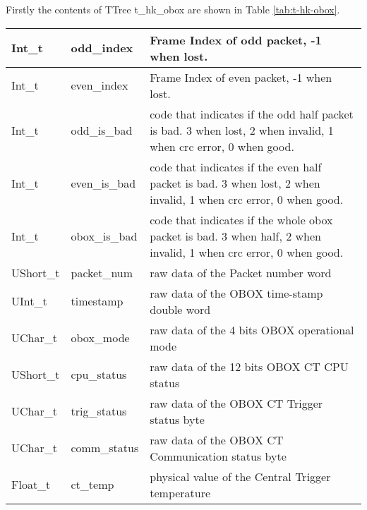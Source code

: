\documentclass[a4paper, 12pt, onecolumn]{article}
\begin{document}
Firstly the contents of TTree t\_hk\_obox are shown in Table \ref{tab:t-hk-obox}.

\begin{center}
  \label{tab:t-hk-obox}    
  \tablelasttail{\hline}
  \begin{supertabular}{| p{18mm} | p{38mm} | p{66mm} |}
    Int\_t      & odd\_index               & Frame Index of odd packet, -1 when lost. \\\hline
    Int\_t      & even\_index              & Frame Index of even packet, -1 when lost. \\\hline
    Int\_t      & odd\_is\_bad             & code that indicates if the odd half packet is bad. 3 when lost, 2 when invalid, 1 when crc error, 0 when good. \\\hline
    Int\_t      & even\_is\_bad            & code that indicates if the even half packet is bad. 3 when lost, 2 when invalid, 1 when crc error, 0 when good. \\\hline
    Int\_t      & obox\_is\_bad            & code that indicates if the whole obox packet is bad. 3 when half, 2 when invalid, 1 when crc error, 0 when good. \\\hline
    UShort\_t   & packet\_num              & raw data of the Packet number word \\\hline
    UInt\_t     & timestamp                & raw data of the OBOX time-stamp double word \\\hline
    UChar\_t    & obox\_mode               & raw data of the 4 bits OBOX operational mode \\\hline
    UShort\_t   & cpu\_status              & raw data of the 12 bits OBOX CT CPU status \\\hline
    UChar\_t    & trig\_status             & raw data of the OBOX CT Trigger status byte \\\hline
    UChar\_t    & comm\_status             & raw data of the OBOX CT Communication status byte \\\hline
    Float\_t    & ct\_temp                 & physical value of the Central Trigger temperature  \\\hline

\end{supertabular}
\end{center}
\end{document}
